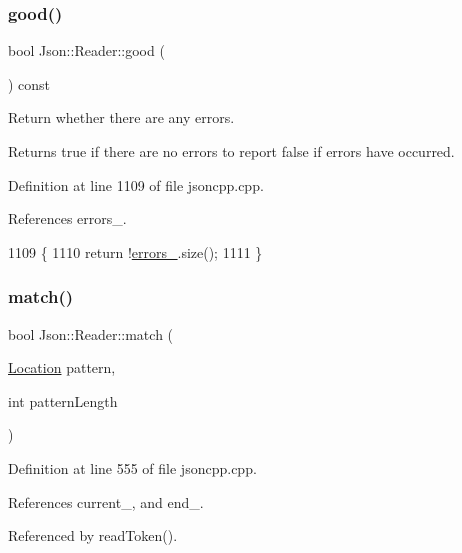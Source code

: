 \subsubsection{\texorpdfstring{good()}{good()}}
{\footnotesize\ttfamily bool Json\+::\+Reader\+::good (\begin{DoxyParamCaption}{ }\end{DoxyParamCaption}) const}



Return whether there are any errors. 

\begin{DoxyReturn}{Returns}
{\ttfamily true} if there are no errors to report {\ttfamily false} if errors have occurred. 
\end{DoxyReturn}


Definition at line 1109 of file jsoncpp.\+cpp.



References errors\+\_\+.


\begin{DoxyCode}
1109                         \{
1110   \textcolor{keywordflow}{return} !\hyperlink{class_json_1_1_reader_a1bbce45dc4df753bed60c129f4b5147c}{errors\_}.size();
1111 \}
\end{DoxyCode}
\mbox{\label{class_json_1_1_reader_a3e5a7bc6b7b53f2ca8cb9da42f8ffb21}} 
\subsubsection{\texorpdfstring{match()}{match()}}
{\footnotesize\ttfamily bool Json\+::\+Reader\+::match (\begin{DoxyParamCaption}\item[{\hyperlink{class_json_1_1_reader_a46795b5b272bf79a7730e406cb96375a}{Location}}]{pattern,  }\item[{int}]{pattern\+Length }\end{DoxyParamCaption})\hspace{0.3cm}{\ttfamily [private]}}



Definition at line 555 of file jsoncpp.\+cpp.



References current\+\_\+, and end\+\_\+.



Referenced by read\+Token().


